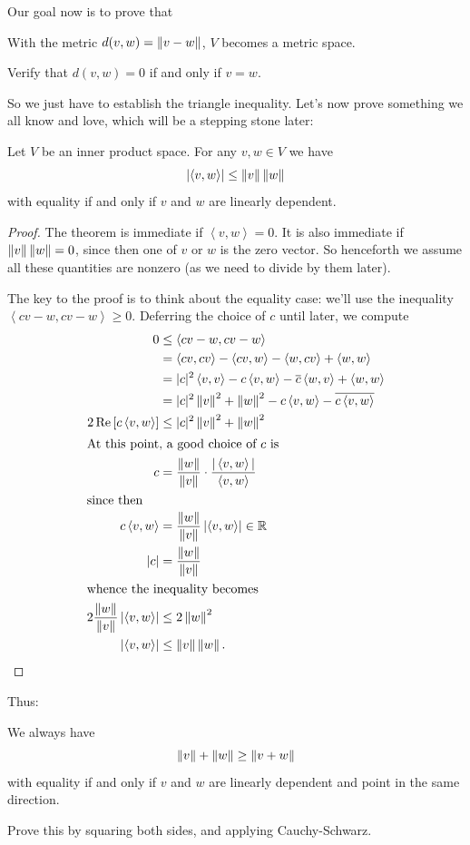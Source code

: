 Our goal now is to prove that
\begin{moral}
	With the metric $d(v,w) = \left\lVert v-w \right\rVert$, $V$ becomes a metric space.
\end{moral}
\begin{ques}
	Verify that $d(v,w) = 0$ if and only if $v = w$.
\end{ques}
So we just have to establish the triangle inequality.
Let's now prove something we all know and love,
which will be a stepping stone later:
\begin{lemma}
	Let $V$ be an inner product space.
	For any $v,w \in V$ we have
	\[ \left\lvert \left< v,w\right> \right\rvert
	\le \left\lVert v \right\rVert \left\lVert w \right\rVert \]
	with equality if and only if $v$ and $w$ are linearly dependent.
\end{lemma}
\begin{proof}
	The theorem is immediate if $\left< v,w\right> = 0$.
	It is also immediate if $\left\lVert v \right\rVert \left\lVert w \right\rVert = 0$,
	since then one of $v$ or $w$ is the zero vector.
	So henceforth we assume all these quantities are nonzero
	(as we need to divide by them later).

	The key to the proof is to think about the equality case:
	we'll use the inequality $\left< cv-w, cv-w\right> \ge 0$.
	Deferring the choice of $c$ until later, we compute
	\begin{align*}
		0 &\le \left< cv-w, cv-w \right> \\
		&= \left< cv, cv\right> - \left< cv, w\right> - \left< w, cv\right> + \left< w,w \right> \\
		&= |c|^2 \left< v,v \right> - c \left< v,w \right> - \overline c \left< w,v \right> + \left< w,w \right> \\
		&= |c|^2 \left\lVert v \right\rVert^2 + \left\lVert w \right\rVert^2 - c \left< v,w \right> - \overline{c \left< v,w\right> } \\
		2 \operatorname{Re} \left[ c \left< v,w \right> \right] &\le |c|^2 \left\lVert v \right\rVert^2 + \left\lVert w \right\rVert^2  \\
		\intertext{At this point, a good choice of $c$ is}
		c &= \frac{ \left\lVert w \right\rVert}{\left\lVert v \right\rVert} \cdot \frac{|\left< v,w\right>|}{\left< v,w\right>} \\
		\intertext{since then}
		c \left< v,w \right> &= \frac{\left\lVert w \right\rVert}{\left\lVert v \right\rVert} \left\lvert \left< v,w\right> \right\rvert \in \mathbb R \\
		|c| &= \frac{\left\lVert w \right\rVert}{\left\lVert v \right\rVert} \\
		\intertext{whence the inequality becomes}
		2\frac{\left\lVert w \right\rVert}{\left\lVert v \right\rVert} \left\lvert \left< v,w\right> \right\rvert &\le 2 \left\lVert w \right\rVert^2  \\
		\left\lvert \left< v,w\right> \right\rvert &\le \left\lVert v \right\rVert \left\lVert w \right\rVert. \qedhere
	\end{align*}
\end{proof}
Thus:
\begin{theorem}
	\label{thm:inner_product_tri_ineq}
	We always have
	\[ \left\lVert v \right\rVert + \left\lVert w \right\rVert \ge \left\lVert v+w \right\rVert \]
	with equality if and only if $v$ and $w$ are linearly dependent
	and point in the same direction.
\end{theorem}
\begin{exercise}
	Prove this by squaring both sides, and applying Cauchy-Schwarz.
\end{exercise}

